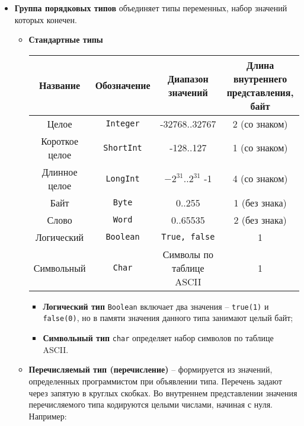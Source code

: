 \begin{itemize}
\item {\bf {Группа порядковых типов}} объединяет типы переменных, набор значений которых конечен.

    \begin{itemize}    
    \item {\bf{Стандартные типы}}

        {\small
        \begin{center}
        \begin{tabular}{ | c | c | c | c | }
        \hline
        Название & Обозначение & Диапазон значений & Длина внутреннего представления, байт\\
        \hline
        Целое & \texttt{Integer} & -32768..32767 & 2 (со знаком) \\
        \hline
        Короткое целое & \texttt{ShortInt} & -128..127 & 1 (со знаком) \\
        \hline
        Длинное целое & \texttt{LongInt} & $-2^{31}$..$2^{31}$ -1 & 4 (со знаком) \\
        \hline
        Байт & \texttt{Byte} & 0..255 & 1 (без знака) \\
        \hline
        Слово & \texttt{Word} & 0..65535 & 2 (без знака) \\
        \hline
        Логический & \texttt{Boolean} & \texttt{True, false} & 1 \\ 
        \hline
        Символьный & \texttt{Char} & Символы по таблице ASCII & 1\\
        \hline
        \end{tabular}
        \end{center}
        }
        
        \begin{itemize}
            \item {\bf{Логический тип}} \texttt{Boolean} включает два значения – \texttt{true(1)} и \texttt{false(0)}, но в памяти значения данного типа занимают целый байт;

            \item {\bf{Символьный тип}} \texttt{char} определяет набор символов по таблице ASCII. 
        \end{itemize}

    \item {\bf{Перечисляемый тип (перечисление)}} 
        – формируется из значений, определенных программистом при объявлении типа. Перечень задают через запятую в круглых скобках. Во внутреннем представлении значения перечисляемого типа кодируются целыми числами, начиная с нуля. Например:



\end{itemize}
\end{itemize}
